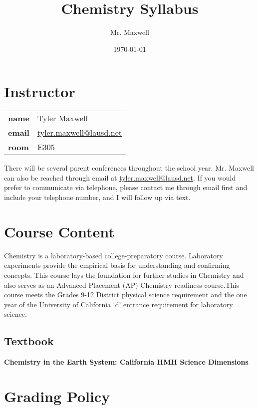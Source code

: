\documentclass[11pt]{article}
\author{Mr. Maxwell}
\date{\today}
\title{Chemistry Syllabus}
\begin{document}
\maketitle

\section{Instructor}
\label{sec:orgeac8a8d}

\begin{center}
\begin{tabular}{ll}
\textbf{\textbf{name}} & Tyler Maxwell\\[0pt]
\textbf{\textbf{email}} & \href{mailto:tyler.maxwell@lausd.net}{tyler.maxwell@lausd.net}\\[0pt]
\textbf{\textbf{room}} & E305\\[0pt]
\end{tabular}
\end{center}

There will be several parent conferences throughout the school year. Mr. Maxwell can also be reached through email at \href{mailto:tyler.maxwell@lausd.net}{tyler.maxwell@lausd.net}. If you would prefer to communicate via telephone, please contact me through email first and include your telephone number, and I will follow up via text.

\section{Course Content}
\label{sec:org5803fc8}

Chemistry is a laboratory-based college-preparatory course. Laboratory experiments provide the empirical basis for understanding and confirming concepts. This course lays the foundation for further studies in Chemistry and also serves as an Advanced Placement (AP) Chemistry readiness course.This course meets the Grades 9-12 District physical science requirement and the one year of the University of California ‘d’ entrance requirement for laboratory science.

\subsection{Textbook}
\label{sec:org17e7d97}

\textbf{\textbf{Chemistry in the Earth System: California HMH Science Dimensions}}

\section{Grading Policy}
\label{sec:orgace3d29}
\end{document}
